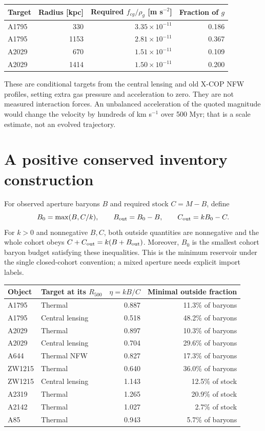 \documentclass[11pt]{article}
\begin{document}
\begin{center}
\begin{tabular}{lrrr}
\toprule
Target & Radius [kpc] & Required $f_{cg}/\rho_g$ [m s$^{-2}$] & Fraction of $g$\\
\midrule
A1795 & 330 & $3.35\times10^{-11}$ & 0.186\\
A1795 & 1153 & $2.81\times10^{-11}$ & 0.367\\
A2029 & 670 & $1.51\times10^{-11}$ & 0.109\\
A2029 & 1414 & $1.50\times10^{-11}$ & 0.200\\
\bottomrule
\end{tabular}
\end{center}
These are conditional targets from the central lensing and old X-COP NFW profiles, setting extra gas pressure and acceleration to zero. They are not measured interaction forces. An unbalanced acceleration of the quoted magnitude would change the velocity by hundreds of km s$^{-1}$ over 500 Myr; that is a scale estimate, not an evolved trajectory.

\clearpage
\section{A positive conserved inventory construction}
For observed aperture baryons $B$ and required stock $C=M-B$, define
\begin{equation}
B_0=\max(B,C/k),\qquad
B_{\rm out}=B_0-B,\qquad C_{\rm out}=kB_0-C.
\label{eq:cohort}
\end{equation}
For $k>0$ and nonnegative $B,C$, both outside quantities are nonnegative and the whole cohort obeys $C+C_{\rm out}=k(B+B_{\rm out})$. Moreover, $B_0$ is the smallest cohort baryon budget satisfying these inequalities. This is the minimum reservoir under the single closed-cohort convention; a mixed aperture needs explicit import labels.

\begin{center}\small
\begin{tabular}{llrr}
\toprule
Object & Target at its $R_{500}$ & $\eta=kB/C$ & Minimal outside fraction\\
\midrule
A1795 & Thermal & 0.887 & 11.3\% of baryons\\
A1795 & Central lensing & 0.518 & 48.2\% of baryons\\
A2029 & Thermal & 0.897 & 10.3\% of baryons\\
A2029 & Central lensing & 0.704 & 29.6\% of baryons\\
A644 & Thermal NFW & 0.827 & 17.3\% of baryons\\
ZW1215 & Thermal & 0.640 & 36.0\% of baryons\\
ZW1215 & Central lensing & 1.143 & 12.5\% of stock\\
A2319 & Thermal & 1.265 & 20.9\% of stock\\
A2142 & Thermal & 1.027 & 2.7\% of stock\\
A85 & Thermal & 0.943 & 5.7\% of baryons\\
\bottomrule
\end{tabular}
\end{center}
\end{document}
